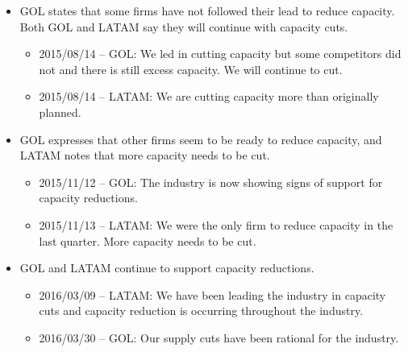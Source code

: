 \begin{itemize}
\begin{itemize}
\item 2015/03/31 -- GOL: We believe Avianca and Azul will pursue the
rational sales approach started by GOL and followed by LATAM.

\item 2015/05/13 -- GOL: We continue to be committed not to expand supply.
While some competitors have increased supply, we believe this is about to
change.
\end{itemize}

\item GOL states that some firms have not followed their lead to reduce
capacity. Both GOL and LATAM say they will continue with capacity cuts.

\begin{itemize}
\item 2015/08/14 -- GOL: We led in cutting capacity but some competitors did
not and there is still excess capacity. We will continue to cut.

\item 2015/08/14 -- LATAM: We are cutting capacity more than originally
planned.
\end{itemize}

\item GOL expresses that other firms seem to be ready to reduce capacity,
and LATAM notes that more capacity needs to be cut.

\begin{itemize}
\item 2015/11/12 -- GOL: The industry is now showing signs of support for
capacity reductions.

\item 2015/11/13 -- LATAM: We were the only firm to reduce capacity in the
last quarter. More capacity needs to be cut.
\end{itemize}

\item GOL and LATAM continue to support capacity reductions.

\begin{itemize}
\item 2016/03/09 -- LATAM: We have been leading the industry in capacity
cuts and capacity reduction is occurring throughout the industry.

\item 2016/03/30 -- GOL: Our supply cuts have been rational for the
industry.
\end{itemize}


\end{itemize}
